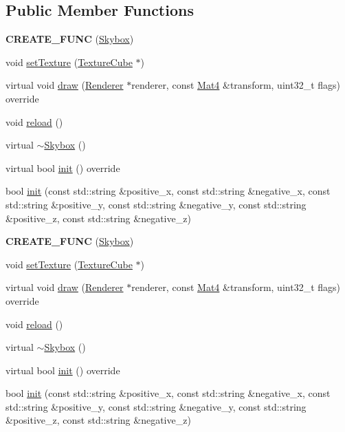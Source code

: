 \subsection*{Public Member Functions}
\begin{DoxyCompactItemize}
\item 
\mbox{\label{classSkybox_aeacc959f9c1ee1d96b49a740a31e3846}} 
{\bfseries C\+R\+E\+A\+T\+E\+\_\+\+F\+U\+NC} (\hyperlink{classSkybox}{Skybox})
\item 
void \hyperlink{classSkybox_a60f515eb4326c4f077817992396147f8}{set\+Texture} (\hyperlink{classTextureCube}{Texture\+Cube} $\ast$)
\item 
virtual void \hyperlink{classSkybox_a08385a028880991afa6550e25720c37e}{draw} (\hyperlink{classRenderer}{Renderer} $\ast$renderer, const \hyperlink{classMat4}{Mat4} \&transform, uint32\+\_\+t flags) override
\item 
void \hyperlink{classSkybox_af09eb13578e196610693fd7fe4be6805}{reload} ()
\item 
virtual \hyperlink{classSkybox_a62ad4c6b4b1965a0a6d8536a50d4c090}{$\sim$\+Skybox} ()
\item 
virtual bool \hyperlink{classSkybox_a85612eb2cee2df59fdc97476317c347b}{init} () override
\item 
bool \hyperlink{classSkybox_a854a496cdc9ae6cbae756c9ff07505c3}{init} (const std\+::string \&positive\+\_\+x, const std\+::string \&negative\+\_\+x, const std\+::string \&positive\+\_\+y, const std\+::string \&negative\+\_\+y, const std\+::string \&positive\+\_\+z, const std\+::string \&negative\+\_\+z)
\item 
\mbox{\label{classSkybox_aeacc959f9c1ee1d96b49a740a31e3846}} 
{\bfseries C\+R\+E\+A\+T\+E\+\_\+\+F\+U\+NC} (\hyperlink{classSkybox}{Skybox})
\item 
void \hyperlink{classSkybox_a60f515eb4326c4f077817992396147f8}{set\+Texture} (\hyperlink{classTextureCube}{Texture\+Cube} $\ast$)
\item 
virtual void \hyperlink{classSkybox_a6276d85580a2b725dd5dac0c4837c640}{draw} (\hyperlink{classRenderer}{Renderer} $\ast$renderer, const \hyperlink{classMat4}{Mat4} \&transform, uint32\+\_\+t flags) override
\item 
void \hyperlink{classSkybox_af09eb13578e196610693fd7fe4be6805}{reload} ()
\item 
virtual \hyperlink{classSkybox_a75809f0396413e4e74a348291fcd99f9}{$\sim$\+Skybox} ()
\item 
virtual bool \hyperlink{classSkybox_a0543d3957718514e374cc351dad5315e}{init} () override
\item 
bool \hyperlink{classSkybox_a854a496cdc9ae6cbae756c9ff07505c3}{init} (const std\+::string \&positive\+\_\+x, const std\+::string \&negative\+\_\+x, const std\+::string \&positive\+\_\+y, const std\+::string \&negative\+\_\+y, const std\+::string \&positive\+\_\+z, const std\+::string \&negative\+\_\+z)
\end{DoxyCompactItemize}
